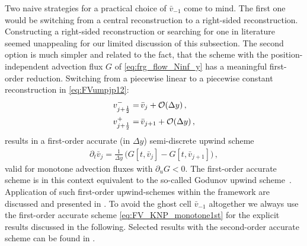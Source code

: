 Two naive strategies for a practical choice of $\bar{v}_{-1}$ come to mind.
The first one would be switching from a central reconstruction to a right-sided reconstruction.
Constructing a right-sided \tvd{} reconstruction or searching for one in literature seemed unappealing for our limited discussion of this subsection.
The second option is much simpler and related to the fact, that the \knp{} scheme with the position-independent advection flux $G$ of \cref{eq:frg_flow_Ninf_y} has a meaningful first-order reduction. 
Switching from a piecewise linear to a piecewise constant reconstruction in \cref{eq:FVumpjp12}:
\begin{subequations}\label{eq:FV_up12mp1st}
\begin{align}
	v_{j + \frac{1}{2}}^{-} = \, & \bar{v}_j + \mathcal{O} ( \Delta y ) \, ,\label{eq:FV_up12m1st}\\[.1em]
	v_{j + \frac{1}{2}}^{+} = \, & \bar{v}_{j+1} + \mathcal{O} ( \Delta y ) \, ,\label{eq:FV_up12p1st}
\end{align}
\end{subequations}
results in a first-order accurate (in $\Delta y$) semi-discrete upwind scheme~\cite{KTO2-1,10.2307/2157317,10.2307/2030019}
\begin{align}
	\partial_t \bar{v}_j = \tfrac{1}{\Delta y} \, \big( G[t,\bar{v}_{j}] - G[t,\bar{v}_{j + 1}] \big) \, , \label{eq:FV_KNP_monotone1st}
\end{align}
valid for monotone advection fluxes with $\partial_u G<0$.
The first-order accurate \knp{} scheme is in this context equivalent to the so-called Godunov upwind scheme~\cite{10.2307/2157317,10.2307/2030019}.
Application of such first-order upwind-schemes within the \frg{} framework are discussed and presented in .
To avoid the ghost cell $\bar{v}_{-1}$ altogether we always use the first-order accurate \knp{} scheme \eqref{eq:FV_KNP_monotone1st} for the explicit results discussed in the following.
Selected results with the second-order accurate \knp{} scheme can be found in \LargeNnumApp{}.
	
